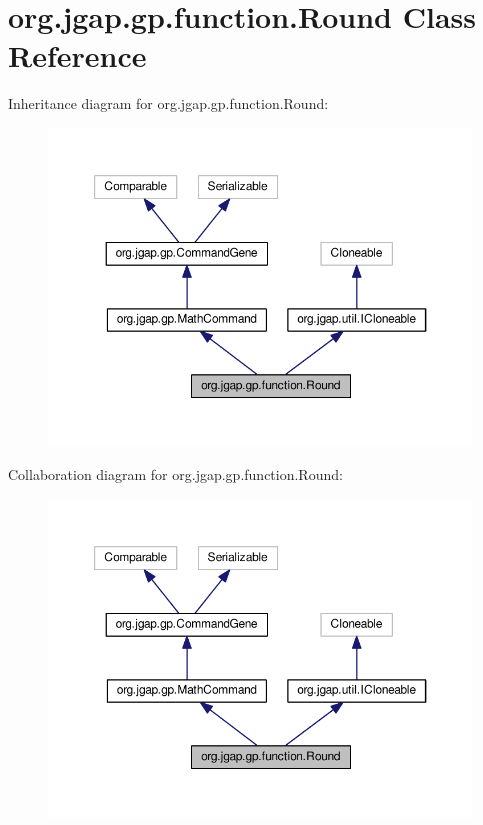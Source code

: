 \hypertarget{classorg_1_1jgap_1_1gp_1_1function_1_1_round}{\section{org.\-jgap.\-gp.\-function.\-Round Class Reference}
\label{classorg_1_1jgap_1_1gp_1_1function_1_1_round}
}


Inheritance diagram for org.\-jgap.\-gp.\-function.\-Round\-:
\nopagebreak
\begin{figure}[H]
\begin{center}
\leavevmode
\includegraphics[width=350pt]{classorg_1_1jgap_1_1gp_1_1function_1_1_round__inherit__graph}
\end{center}
\end{figure}


Collaboration diagram for org.\-jgap.\-gp.\-function.\-Round\-:
\nopagebreak
\begin{figure}[H]
\begin{center}
\leavevmode
\includegraphics[width=350pt]{classorg_1_1jgap_1_1gp_1_1function_1_1_round__coll__graph}
\end{center}
\end{figure}
